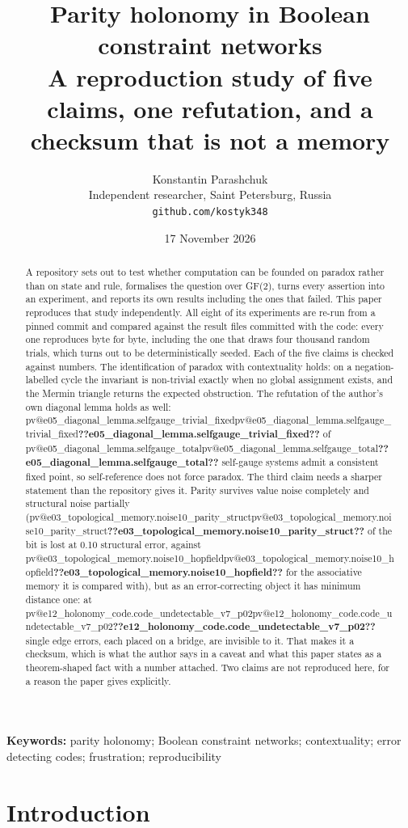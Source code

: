\documentclass[11pt,a4paper]{article}
\title{\bfseries Parity holonomy in Boolean constraint networks\\[2pt]
\large A reproduction study of five claims, one refutation, and a checksum that is not a memory}
\author{Konstantin Parashchuk\\\small Independent researcher, Saint Petersburg, Russia\\
\small \texttt{github.com/\allowbreak{}kostyk348}}
\date{17 November 2026}
\makeatletter
\newcommand{\val}[1]{\ifcsname pv@#1\endcsname\csname pv@#1\endcsname\else\textbf{??#1??}\fi}
\makeatother
\begin{document}
\maketitle

\begin{abstract}
\noindent
A repository sets out to test whether computation can be founded on paradox rather than on
state and rule, formalises the question over GF(2), turns every assertion into an experiment, and
reports its own results including the ones that failed. This paper reproduces that study
independently. All eight of its experiments are re-run from a pinned commit and compared against the
result files committed with the code: every one reproduces byte for byte, including the one that
draws four thousand random trials, which turns out to be deterministically seeded. Each of the five claims
is checked against numbers. The identification of paradox with contextuality holds: on a
negation-labelled cycle the invariant is non-trivial exactly when no global assignment exists,
and the Mermin triangle returns the expected obstruction. The refutation of the author's own
diagonal lemma holds as well: \val{e05_diagonal_lemma.selfgauge_trivial_fixed} of \val{e05_diagonal_lemma.selfgauge_total} self-gauge
systems admit a consistent fixed point, so self-reference does not force paradox. The third
claim needs a sharper statement than the repository gives it. Parity survives value noise
completely and structural noise partially (\val{e03_topological_memory.noise10_parity_struct} of
the bit is lost at 0.10 structural error, against
\val{e03_topological_memory.noise10_hopfield} for the associative memory it is compared with), but
as an error-correcting object it has minimum distance one: at \val{e12_holonomy_code.code_undetectable_v7_p02}
single edge errors, each placed on a bridge, are invisible to it. That makes it a checksum, which is what the
author says in a caveat and what this paper states as a theorem-shaped fact with a number
attached. Two claims are not reproduced here, for a reason the paper gives explicitly.
\end{abstract}

\noindent\textbf{Keywords:} parity holonomy; Boolean constraint networks; contextuality; error
detecting codes; frustration; reproducibility

\section{Introduction}
\end{document}
